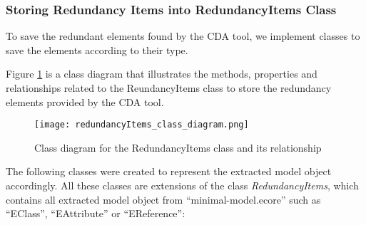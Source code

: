 \subsubsection*{Storing Redundancy Items into RedundancyItems Class}
To save the redundant elements found by the CDA tool, we implement classes to save the elements according to their type.

Figure \ref{fig:redundancyItems_class_diagram} is a class diagram that illustrates the methods, properties and relationships related to the ReundancyItems class to store the redundancy elements provided by the CDA tool.
\begin{figure}[h]
	\centering 
	\texttt{[image: redundancyItems\_class\_diagram.png]}
	\caption{Class diagram for the RedundancyItems class and its relationship}\label{fig:redundancyItems_class_diagram}
\end{figure} 
The following classes were created to represent the extracted model object accordingly. All these classes are extensions of the class \textit{RedundancyItems}, which contains all extracted model object from \enquote{minimal-model.ecore} such as \enquote{EClass}, \enquote{EAttribute} or \enquote{EReference}:

